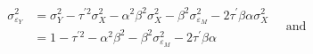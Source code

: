 \begin{equation}
	\label{eq:sigma2eY}
    \begin{split}
        \sigma_{\varepsilon_{Y}}^{2} 
        &=
        \sigma_{Y}^{2} - \tau^{\prime 2} \sigma_{X}^{2} - \alpha^2 \beta^2 \sigma_{X}^{2} - \beta^2 \sigma_{\varepsilon_{M}}^{2} - 2 \tau^{\prime} \beta \alpha \sigma_{X}^{2} \\
        &=
        1 - \tau^{\prime 2} - \alpha^2 \beta^2 - \beta^2 \sigma_{\varepsilon_{M}}^{2} - 2 \tau^{\prime} \beta \alpha 
    \end{split}
	 \quad \text{and}
\end{equation}
